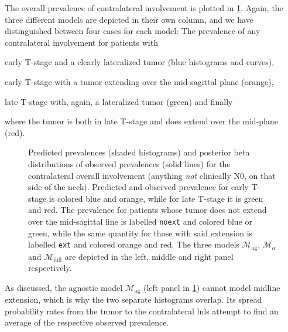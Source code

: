 \documentclass[\relativeRoot/main.tex]{subfiles}
\begin{document}
The overall prevalence of contralateral involvement is plotted in \cref{fig:bilateral:model_comp:contra}. Again, the three different models are depicted in their own column, and we have distinguished between four cases for each model: The prevalence of any contralateral involvement for patients with
\begin{enumerate*}[label={(\arabic*)}]
    \item early T-stage and a clearly lateralized tumor (blue histograms and curves),
    \item early T-stage with a tumor extending over the mid-sagittal plane (orange),
    \item late T-stage with, again, a lateralized tumor (green) and finally
    \item where the tumor is both in late T-stage and does extend over the mid-plane (red).
\end{enumerate*}

\begin{figure}
    \def\svgwidth{1.0\textwidth}
    
    \caption[Comparison of contralateral prevalences]{
        Predicted prevalences (shaded histograms) and posterior beta distributions of observed prevalences (solid lines) for the contralateral overall involvement (anything \emph{not} clinically N0, on that side of the neck). Predicted and observed prevalence for early T-stage is colored blue and orange, while for late T-stage it is green and red. The prevalence for patients whose tumor does not extend over the mid-sagittal line is labelled \texttt{noext} and colored blue or green, while the same quantity for those with said extension is labelled \texttt{ext} and colored orange and red. The three models $\mathcal{M}_\text{ag}$, $\mathcal{M}_\alpha$ and $\mathcal{M}_\text{full}$ are depicted in the left, middle and right panel respectively.
    }
    \label{fig:bilateral:model_comp:contra}
\end{figure}

As discussed, the agnostic model $\mathcal{M}_\text{ag}$ (left panel in \cref{fig:bilateral:model_comp:contra}) cannot model midline extension, which is why the two separate histograms overlap. Its spread probability rates from the tumor to the contralateral \glspl{lnl} attempt to find an average of the respective observed prevalence.
\end{document}
